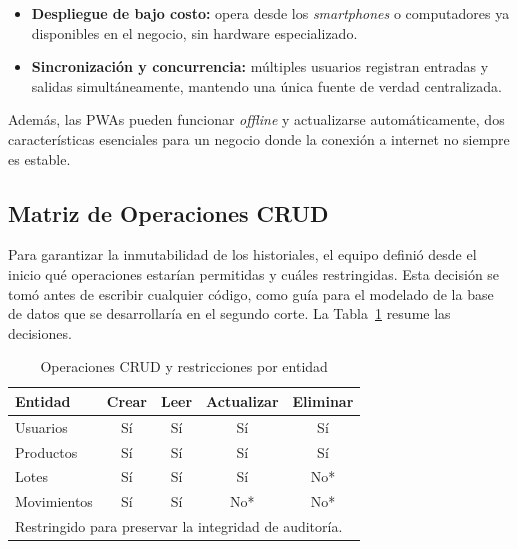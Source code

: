 \documentclass[journal]{IEEEtran}
\begin{document}
	\begin{itemize}[leftmargin=*, label=\textbullet, itemsep=2pt]
		\item \textbf{Despliegue de bajo costo:} opera desde los
		\textit{smartphones} o computadores ya disponibles en
		el negocio, sin hardware especializado.
		
		\item \textbf{Sincronizaci\'{o}n y concurrencia:} m\'{u}ltiples usuarios
		registran entradas y salidas simult\'{a}neamente, mantendo
		una \'{u}nica fuente de verdad centralizada.
	\end{itemize}
	
	Adem\'{a}s, las PWAs pueden funcionar \textit{offline} y
	actualizarse autom\'{a}ticamente, dos caracter\'{i}sticas
	esenciales para un negocio donde la conexi\'{o}n a internet no
	siempre es estable.
	
	\subsection{Matriz de Operaciones CRUD}
	\label{subsec:crud}
	
	Para garantizar la inmutabilidad de los historiales, el equipo
	defini\'{o} desde el inicio qu\'{e} operaciones estar\'{i}an
	permitidas y cu\'{a}les restringidas. Esta decisi\'{o}n se
	tom\'{o} antes de escribir cualquier c\'{o}digo, como gu\'{i}a
	para el modelado de la base de datos que se desarrollar\'{i}a
	en el segundo corte. La Tabla~\ref{tab:crud} resume las
	decisiones.
	
	\begin{table}[htbp]
		\renewcommand{\arraystretch}{1.3}
		\caption{Operaciones CRUD y restricciones por entidad}
		\label{tab:crud}
		\centering
		\begin{tabular}{l c c c c}
			\toprule
			\textbf{Entidad}    &
			\textbf{Crear}      &
			\textbf{Leer}       &
			\textbf{Actualizar} &
			\textbf{Eliminar}   \\
			\midrule
			Usuarios    & S\'{i} & S\'{i} & S\'{i}  & S\'{i}  \\
			Productos   & S\'{i} & S\'{i} & S\'{i}  & S\'{i}  \\
			Lotes       & S\'{i} & S\'{i} & S\'{i}  & No* \\
			Movimientos & S\'{i} & S\'{i} & No* & No* \\
			\bottomrule
			\multicolumn{5}{l}{%
				\footnotesize *Restringido para preservar la integridad
				de auditor\'{i}a.}
		\end{tabular}
	\end{table}
	
\end{document}

